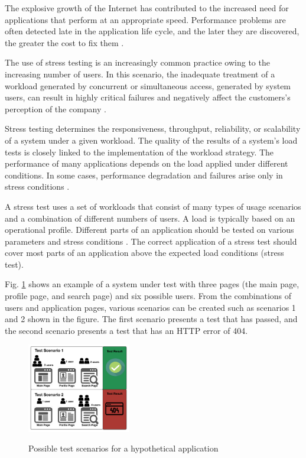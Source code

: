 \documentclass[conference]{IEEEtran}
\begin{document}
The explosive growth of the Internet has contributed to the increased need for applications that perform at an appropriate speed. Performance problems are often detected late in the application life cycle, and the later they are discovered, the greater the cost to fix them \cite{Molyneaux2009}.

The use of stress testing is an increasingly common practice owing to the increasing number of users. In this scenario, the inadequate treatment of a workload generated by concurrent or simultaneous access, generated by system users, can result in highly critical failures and negatively affect the customers's perception of the company \cite{Draheim2006b} \cite{Jiang2010}. 

Stress testing determines the responsiveness, throughput, reliability, or scalability of a system under a given workload. The quality of the results of a system's load tests is closely linked to the implementation of the workload strategy. The performance of many applications depends on the load applied under different conditions. In some cases, performance degradation and failures arise only in stress conditions \cite{Garousi2010} \cite{Jiang2010}.

A stress test uses a set of workloads that consist of many types of usage scenarios and a combination of different numbers of users. A load is typically based on an operational profile. Different parts of an application should be tested on various parameters and stress conditions \cite{Babbar2011}. The correct application of a stress test should cover most parts of an application above the expected load conditions (stress test)\cite{Draheim2006b}.


Fig. \ref{fig:example} shows an example of a system under test with three pages (the main page, profile page, and search page) and six possible users. From the combinations of users and application pages, various scenarios can be created such as scenarios 1 and 2 shown in the figure. The first scenario presents a test that has passed, and the second scenario presents a test that has an HTTP error of 404.

\begin{figure}[ht]
\centering
\caption{Possible test scenarios for a hypothetical application}
\includegraphics[width=0.4\textwidth]{./images/diagram.png}
\label{fig:example}
\end{figure}
\end{document}
